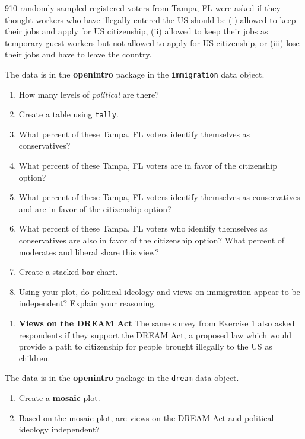 \documentclass[
]{book}
\providecommand{\tightlist}{%
  \setlength{\itemsep}{0pt}\setlength{\parskip}{0pt}}
\begin{document}
910 randomly sampled registered voters from Tampa, FL were asked if they thought workers who have illegally entered the US should be (i) allowed to keep their jobs and apply for US citizenship, (ii) allowed to keep their jobs as temporary guest workers but not allowed to apply for US citizenship, or (iii) lose their jobs and have to leave the country.

The data is in the \textbf{openintro} package in the \texttt{immigration} data object.

\begin{enumerate}
\def\labelenumi{\alph{enumi}.}
\tightlist
\item
  How many levels of \emph{political} are there?\\
\item
  Create a table using \texttt{tally}.
\item
  What percent of these Tampa, FL voters identify themselves as conservatives?
\item
  What percent of these Tampa, FL voters are in favor of the citizenship option?
\item
  What percent of these Tampa, FL voters identify themselves as conservatives and are in favor of the citizenship option?
\item
  What percent of these Tampa, FL voters who identify themselves as conservatives are also in favor of the citizenship option? What percent of moderates and liberal share this view?
\item
  Create a stacked bar chart.
\item
  Using your plot, do political ideology and views on immigration appear to be independent? Explain your reasoning.
\end{enumerate}

\begin{enumerate}
\def\labelenumi{\arabic{enumi}.}
\setcounter{enumi}{1}
\tightlist
\item
  \textbf{Views on the DREAM Act} The same survey from Exercise 1 also asked respondents if they support the DREAM Act, a proposed law which would provide a path to citizenship for people brought illegally to the US as children.
\end{enumerate}

The data is in the \textbf{openintro} package in the \texttt{dream} data object.

\begin{enumerate}
\def\labelenumi{\alph{enumi}.}
\tightlist
\item
  Create a \textbf{mosaic} plot.
\item
  Based on the mosaic plot, are views on the DREAM Act and political ideology independent?
\end{enumerate}
\end{document}
